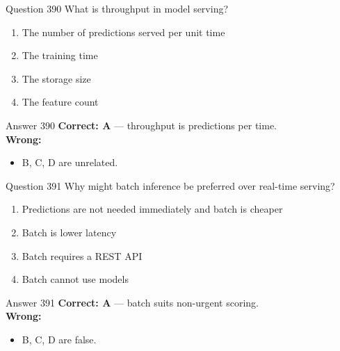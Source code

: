 \documentclass[aspectratio=169,11pt]{beamer}
\begin{document}
	\begin{frame}{Question 390}
		What is throughput in model serving?
		\begin{enumerate}[label=\Alph*.]
			\item The number of predictions served per unit time
			\item The training time
			\item The storage size
			\item The feature count
		\end{enumerate}
	\end{frame}
	\begin{frame}{Answer 390}
		\textbf{Correct: A} --- throughput is predictions per time.\\
		\vspace{0.5em}
		\textbf{Wrong:}
		\begin{itemize}
			\item B, C, D are unrelated.
		\end{itemize}
	\end{frame}
	
	\begin{frame}{Question 391}
		Why might batch inference be preferred over real-time serving?
		\begin{enumerate}[label=\Alph*.]
			\item Predictions are not needed immediately and batch is cheaper
			\item Batch is lower latency
			\item Batch requires a REST API
			\item Batch cannot use models
		\end{enumerate}
	\end{frame}
	\begin{frame}{Answer 391}
		\textbf{Correct: A} --- batch suits non-urgent scoring.\\
		\vspace{0.5em}
		\textbf{Wrong:}
		\begin{itemize}
			\item B, C, D are false.
		\end{itemize}
	\end{frame}
	
\end{document}
